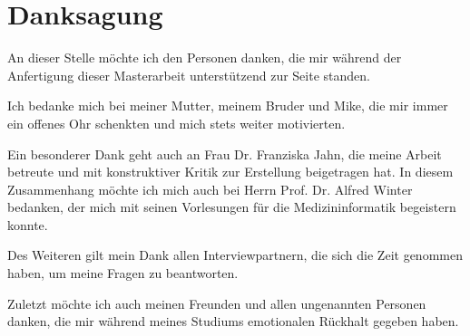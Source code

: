 
\begingroup
\let\clearpage\relax
\let\cleardoublepage\relax
\let\cleardoublepage\relax
\chapter*{Danksagung}

An dieser Stelle möchte ich den Personen danken, die mir während der Anfertigung dieser Masterarbeit unterstützend zur Seite standen.

Ich bedanke mich bei meiner Mutter, meinem Bruder und Mike, die mir immer ein offenes Ohr schenkten und mich stets weiter motivierten.

Ein besonderer Dank geht auch an Frau Dr. Franziska Jahn, die meine Arbeit betreute und mit konstruktiver Kritik zur Erstellung beigetragen hat. In diesem Zusammenhang möchte ich mich auch bei Herrn Prof. Dr. Alfred Winter bedanken, der mich mit seinen Vorlesungen für die Medizininformatik begeistern konnte.

Des Weiteren gilt mein Dank allen Interviewpartnern, die sich die Zeit genommen haben, um meine Fragen zu beantworten.

Zuletzt möchte ich auch meinen Freunden und allen ungenannten Personen danken, die mir während meines Studiums emotionalen Rückhalt gegeben haben.

\endgroup
